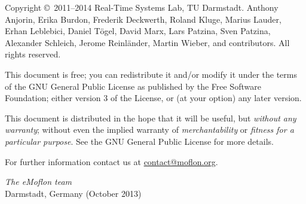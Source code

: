 \begin{small} 
Copyright \copyright~2011--2014 Real-Time Systems Lab, TU Darmstadt.
Anthony Anjorin, Erika Burdon, Frederik Deckwerth, Roland Kluge, Marius Lauder,
Erhan Leblebici, Daniel T\"ogel, David Marx, Lars Patzina, Sven Patzina, Alexander
Schleich, Jerome Reinl\"ander, Martin Wieber, and contributors.
All rights reserved.

This document is free; you can redistribute it and/or modify it under the terms of the GNU General Public License as published by the Free Software Foundation; either version 3 of the License, or (at your option) any later version.
 
This document is distributed in the hope that it will be useful, but \emph{without any warranty}; without even the implied warranty of \emph{merchantability} or \emph{fitness for a particular purpose}.
See the GNU General Public License for more details.
 
  
For further information contact us at \href{mailto:contact@moflon.org}{contact@moflon.org}.
  
\vskip3cm
\textit{The eMoflon team}\\
Darmstadt, Germany (October 2013)
\end{small}
